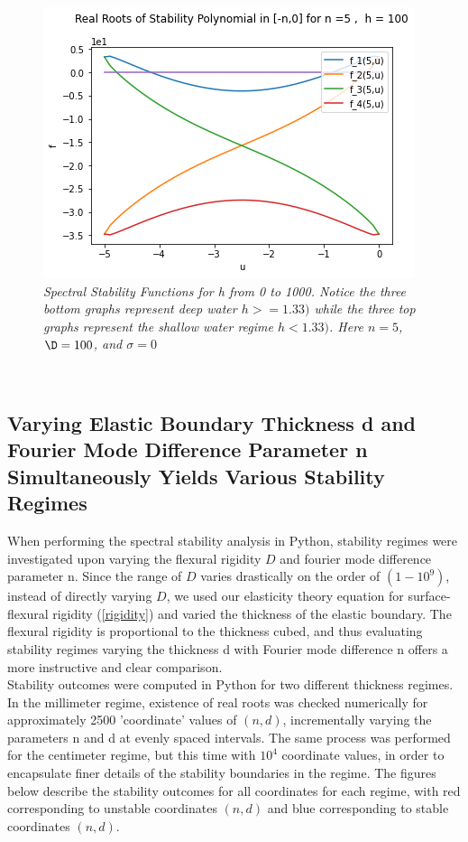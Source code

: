 \documentclass{article}
\begin{document}
\begin{figure}[hbt!]
\includegraphics[width=.3\textwidth]{h6.png}\hfill
\caption{\emph{Spectral Stability Functions for h from 0 to 1000. Notice the three bottom graphs represent deep water \(h >= 1.33)\) while the three top graphs represent the shallow water regime \(h < 1.33)\). Here \(n = 5\), \(\D = 100\), and \(\sigma = 0\)}} \label{hvary}
\end{figure}



\\

\subsection{Varying Elastic Boundary Thickness d and Fourier Mode Difference Parameter  n Simultaneously Yields Various Stability Regimes}

When performing the spectral stability analysis in Python, stability regimes were investigated upon varying the flexural rigidity \(D\) and fourier mode difference parameter n. Since the range of \(D\) varies drastically on the order of \((1-10^9)\), instead of directly varying \(D\), we used our elasticity theory equation for surface-flexural rigidity (\ref{rigidity}) and varied the thickness of the elastic boundary. The flexural rigidity is proportional to the thickness cubed, and thus evaluating stability regimes varying the thickness d with Fourier mode difference n offers a more instructive and clear comparison. \\

Stability outcomes were computed in Python for two different thickness regimes. In the millimeter regime, existence of real roots was checked numerically for approximately 2500 'coordinate' values of \((n,d)\), incrementally varying the parameters n and d at evenly spaced intervals. The same process was performed for the centimeter regime, but this time with \(10^4\) coordinate values, in order to encapsulate finer details of the stability boundaries in the regime. The figures below describe the stability outcomes for all coordinates for each regime, with red corresponding to unstable coordinates \((n,d)\) and blue corresponding to stable coordinates \((n,d)\). \\
\end{document}
